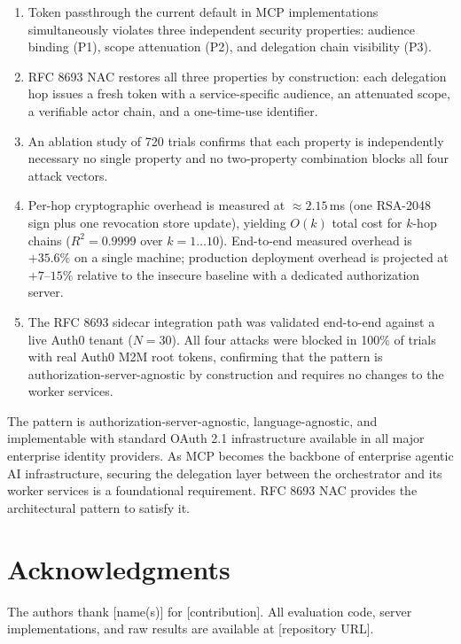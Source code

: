 \documentclass[journal]{IEEEtran}
\begin{document}
\begin{enumerate}
  \item Token passthrough the current default in MCP implementations 
        simultaneously violates three independent security properties: audience
        binding (P1), scope attenuation (P2), and delegation chain visibility
        (P3).
  \item RFC 8693 NAC restores all three properties by construction: each
        delegation hop issues a fresh token with a service-specific audience,
        an attenuated scope, a verifiable actor chain, and a one-time-use
        identifier.
  \item An ablation study of 720 trials confirms that each property is
        independently necessary no single property and no two-property
        combination blocks all four attack vectors.
  \item Per-hop cryptographic overhead is measured at $\approx 2.15$\,ms
        (one RSA-2048 sign plus one revocation store update), yielding $O(k)$
        total cost for $k$-hop chains ($R^2 = 0.9999$ over $k=1\ldots10$).
        End-to-end measured overhead is $+35.6\%$ on a single machine;
        production deployment overhead is projected at $+7$--$15\%$ relative
        to the insecure baseline with a dedicated authorization server.
  \item The RFC 8693 sidecar integration path was validated end-to-end against
        a live Auth0 tenant ($N=30$). All four attacks were blocked in 100\% of
        trials with real Auth0 M2M root tokens, confirming that the pattern is
        authorization-server-agnostic by construction and requires no changes
        to the worker services.
\end{enumerate}

The pattern is authorization-server-agnostic, language-agnostic, and
implementable with standard OAuth 2.1 infrastructure available in all major
enterprise identity providers. As MCP becomes the backbone of enterprise agentic
AI infrastructure, securing the delegation layer between the orchestrator and its
worker services is a foundational requirement. RFC 8693 NAC provides the
architectural pattern to satisfy it.

\FloatBarrier  %

\section*{Acknowledgments}
The authors thank [name(s)] for [contribution]. All evaluation code, server
implementations, and raw results are available at [repository URL].
\end{document}
